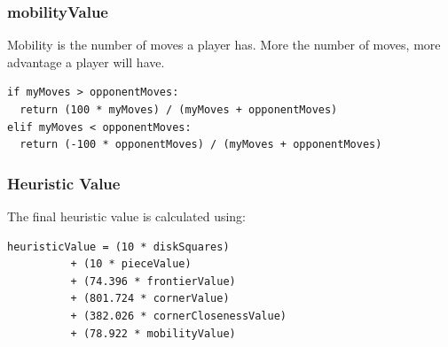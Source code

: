 \documentclass[a4paper,10pt]{article}
\begin{document}
\subsubsection*{mobilityValue}
Mobility is the number of moves a player has. More the number of moves, more advantage a player will have.
\begin{verbatim}
if myMoves > opponentMoves:
  return (100 * myMoves) / (myMoves + opponentMoves)
elif myMoves < opponentMoves:
  return (-100 * opponentMoves) / (myMoves + opponentMoves)
\end{verbatim}

\subsubsection*{Heuristic Value}
The final heuristic value is calculated using:
\begin{verbatim}
heuristicValue = (10 * diskSquares)
		  + (10 * pieceValue)
		  + (74.396 * frontierValue)
		  + (801.724 * cornerValue)
		  + (382.026 * cornerClosenessValue)
		  + (78.922 * mobilityValue)
\end{verbatim}
\newpage
\end{document}
